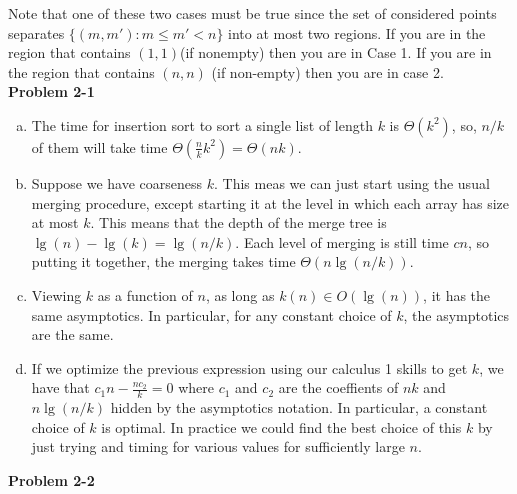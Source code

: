 \documentclass{article}
\begin{document}
Note that one of these two cases must be true since the set of considered points separates $\{(m,m'): m\le m'<n\}$ into at most two regions. If you are in the region that contains $(1,1)$(if nonempty) then you are in Case 1. If you are in the region that contains $(n,n)$ (if non-empty) then you are in case 2. \\

\noindent\textbf{Problem 2-1} \\

\begin{enumerate}[a.]
\item
The time for insertion sort to sort a single list of length $k$ is $\Theta(k^2)$, so, $n/k$ of them will take time $\Theta(\frac{n}{k}k^2) = \Theta(nk)$.

\item
Suppose we have coarseness $k$. This meas we can just start using the usual merging procedure, except starting it at the level in which each array has size at most $k$. This means that the depth of the merge tree is $\lg(n) - \lg(k) = \lg(n/k)$. Each level of merging is still time $cn$, so putting it together, the merging takes time $\Theta(n\lg(n/k))$.


\item
Viewing $k$ as a function of $n$, as long as $k(n)\in O(\lg(n))$, it has the same asymptotics. In particular, for any constant choice of $k$, the asymptotics are the same.

\item
If we optimize the previous expression using our calculus 1 skills to get $k$, we have that $c_1n- \frac{nc_2}{k} = 0$ where $c_1$ and $c_2$ are the coeffients of $nk$ and $n\lg(n/k)$ hidden by the asymptotics notation. In particular, a constant choice of $k$ is optimal. In practice we could find the best choice of this $k$ by just trying and timing  for various values for sufficiently large $n$.

\end{enumerate}

\noindent\textbf{Problem 2-2}\\
\end{document}
